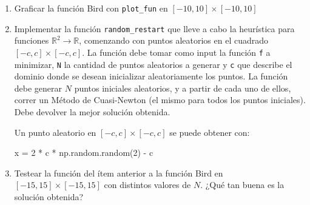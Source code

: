 \documentclass{article}
\begin{document}
\begin{enumerate}
    \item Graficar la función Bird con \texttt{plot\_fun} en $[-10, 10]\times [-10, 10]$
    \item Implementar la función \texttt{random\_restart} que lleve a cabo la heurística para funciones $\mathbb{R}^2\rightarrow \mathbb{R}$, comenzando con puntos aleatorios en el cuadrado $[-c, c]\times [-c, c]$. La función debe tomar como input la función \texttt{f} a minimizar, \texttt{N} la cantidad de puntos aleatorios a generar y \texttt{c} que describe el dominio donde se desean inicializar aleatoriamente los puntos. La función debe generar $N$ puntos iniciales aleatorios, y a partir de cada uno de ellos, correr un Método de Cuasi-Newton (el mismo para todos los puntos iniciales). Debe devolver la mejor solución obtenida.

        Un punto aleatorio en $[-c,c]\times[-c,c]$ se puede obtener con:
    \begin{python}
x = 2 * c * np.random.random(2) - c
    \end{python}
    \item Testear la función del ítem anterior a la función Bird en $[-15, 15]\times [-15, 15]$ con distintos valores de $N$. ¿Qué tan buena es la solución obtenida? 
\end{enumerate}
\end{document}
